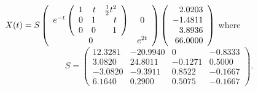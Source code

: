 \documentclass{ximera}
\begin{document}
\ans $X(t) = S
\left(\begin{array}{cc} e^{-t}\left(\begin{array}{rrr}
     1  &  t   &   \frac{1}{2}t^2\\
    0   &  1   &   t\\
    0   &  0   &   1 \end{array}\right) & 0\\ 0 &e^{2t}\end{array}\right)
\left(\begin{array}{r} 2.0203\\ -1.4811 \\ 3.8936\\ 66.0000
\end{array}\right)$ where
\[
S = \left(\begin{array}{rrrr}
   12.3281 & -20.9940 &        0 &  -0.8333\\
    3.0820 &  24.8011 &  -0.1271 &   0.5000\\
   -3.0820 &  -9.3911 &   0.8522 &  -0.1667\\
    6.1640 &   0.2900 &   0.5075 &  -0.1667 \end{array}\right).
\]

\vspace{0.08in}
\end{document}
